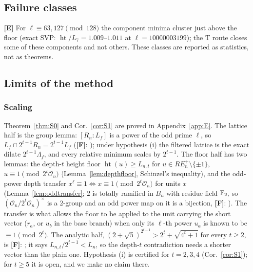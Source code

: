\documentclass[11pt]{amsart}
\theoremstyle{remark}\newtheorem{remark}[theorem]{Remark}
\theoremstyle{definition}\newtheorem{definition}[theorem]{Definition}
\theoremstyle{definition}\newtheorem{algorithm}[theorem]{Algorithm}
\newcommand{\RE}{RE^{+}_n}\newcommand{\ord}{\operatorname{ord}}\newcommand{\hgt}{\operatorname{ht}}
\newcommand{\lbl}[1]{\textbf{[#1]}}\newcommand{\barT}{\bar T_n}
\begin{document}
\subsection{Failure classes} \lbl{E} For $\ell\equiv63,127\pmod{128}$ the component minima cluster just above the floor (exact SVP: $\hgt/L_7=1.009$--$1.011$ at $\ell=10000003199$); the T route closes some of these components and not others. These classes are reported as statistics, not as theorems.

\subsection{Limits of the method}\label{sec:limits}%
\subsubsection{Scaling}\label{sec:scaling}
Theorem~\ref{thm:S0} and Cor.~\ref{cor:S1} are proved in Appendix~\ref{app:E}. The lattice half is the group lemma: $[R_n:L_f]$ is a power of the odd prime $\ell$, so $L_f\cap2^{t-1}R_n=2^{t-1}L_f$ (\lbl{F}: ); under hypothesis (i) the filtered lattice is the exact dilate $2^{t-1}\Lambda_f$, and every relative minimum scales by $2^{t-1}$. The floor half has two lemmas: the depth-$t$ height floor $\hgt(u)\ge L_{n,t}$ for $u\in\RE\setminus\{\pm1\}$, $u\equiv1\pmod{2^t\mathcal O_n}$ (Lemma~\ref{lem:depthfloor}, Schinzel's inequality), and the odd-power depth transfer $x^\ell\equiv1\iff x\equiv1\pmod{2^t\mathcal O_n}$ for units $x$ (Lemma~\ref{lem:oddtransfer}; $2$ is totally ramified in $B_n$ with residue field $\mathbb{F}_2$, so $(\mathcal O_n/2^t\mathcal O_n)^\times$ is a $2$-group and an odd power map on it is a bijection, \lbl{F}: ). The transfer is what allows the floor to be applied to the unit carrying the short vector ($r_a$, or $u_b$ in the base branch) when only its $\ell$-th power $u_a$ is known to be $\equiv1\pmod{2^t}$. The analytic half, $(2+\sqrt5)^{2^{t-1}}>2^t+\sqrt{4^t+1}$ for every $t\ge2$, is \lbl{F}: ; it says $L_{n,t}/2^{t-1}<L_n$, so the depth-$t$ contradiction needs a shorter vector than the plain one. Hypothesis (i) is certified for $t=2,3,4$ (Cor.~\ref{cor:S1}); for $t\ge5$ it is open, and we make no claim there.
\end{document}
